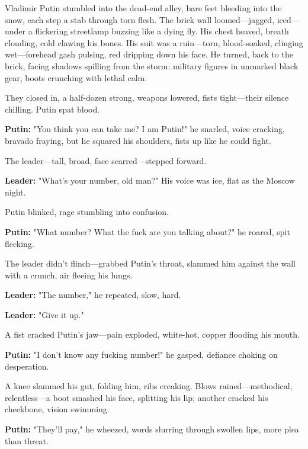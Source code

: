 \documentclass[12pt]{book}
\begin{document}
Vladimir Putin stumbled into the dead-end alley, bare feet bleeding into the snow, each step a stab through torn flesh. The brick wall loomed—jagged, iced—under a flickering streetlamp buzzing like a dying fly. His chest heaved, breath clouding, cold clawing his bones. His suit was a ruin—torn, blood-soaked, clinging wet—forehead gash pulsing, red dripping down his face. He turned, back to the brick, facing shadows spilling from the storm: military figures in unmarked black gear, boots crunching with lethal calm.

They closed in, a half-dozen strong, weapons lowered, fists tight—their silence chilling. Putin spat blood.

\vspace{0.5em}
\textbf{Putin:} "You think you can take me? I am Putin!" he snarled, voice cracking, bravado fraying, but he squared his shoulders, fists up like he could fight.

The leader—tall, broad, face scarred—stepped forward.

\vspace{0.5em}
\textbf{Leader:} "What’s your number, old man?" His voice was ice, flat as the Moscow night.

Putin blinked, rage stumbling into confusion.

\vspace{0.5em}
\textbf{Putin:} "What number? What the fuck are you talking about?" he roared, spit flecking.

The leader didn’t flinch—grabbed Putin’s throat, slammed him against the wall with a crunch, air fleeing his lungs.

\vspace{0.5em}
\textbf{Leader:} "The number," he repeated, slow, hard.

\vspace{0.5em}
\textbf{Leader:} "Give it up."

A fist cracked Putin’s jaw—pain exploded, white-hot, copper flooding his mouth.

\vspace{0.5em}
\textbf{Putin:} "I don’t know any fucking number!" he gasped, defiance choking on desperation.

A knee slammed his gut, folding him, ribs creaking. Blows rained—methodical, relentless—a boot smashed his face, splitting his lip; another cracked his cheekbone, vision swimming.

\vspace{0.5em}
\textbf{Putin:} "They’ll pay," he wheezed, words slurring through swollen lips, more plea than threat.
\end{document}
